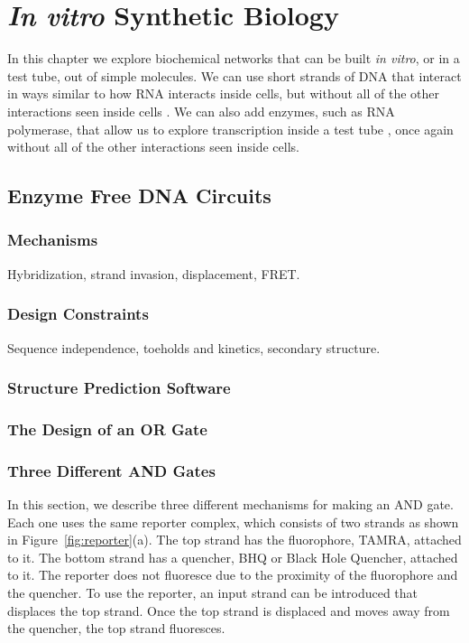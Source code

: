 \chapter{{\em In vitro} Synthetic Biology}

In this chapter we explore biochemical networks that can be built {\em
  in vitro}, or in a test tube, out of simple molecules. We can use
short strands of DNA that interact in ways similar to how RNA
interacts inside cells, but without all of the other interactions seen
inside cells \cite{winfree-logic}. We can also add enzymes, such as
RNA polymerase, that allow us to explore transcription inside a test
tube \cite{kim-winfree-bistable}, once again without all of the other
interactions seen inside cells.

\section{Enzyme Free DNA Circuits}

\subsection{Mechanisms}

Hybridization, strand invasion, displacement, FRET.

\subsection{Design Constraints}

Sequence independence, toeholds and kinetics, secondary structure.

\subsection{Structure Prediction Software}

\subsection{The Design of an OR Gate}

\subsection{Three Different AND Gates}

In this section, we describe three different mechanisms for making an
AND gate. Each one uses the same reporter complex, which consists of
two strands as shown in Figure~\ref{fig:reporter}(a). The top strand
has the fluorophore, TAMRA, attached to it. The bottom strand has a
quencher, BHQ or Black Hole Quencher, attached to it. The reporter
does not fluoresce due to the proximity of the fluorophore and the
quencher. To use the reporter, an input strand can be introduced that
displaces the top strand. Once the top strand is displaced and moves
away from the quencher, the top strand fluoresces.

